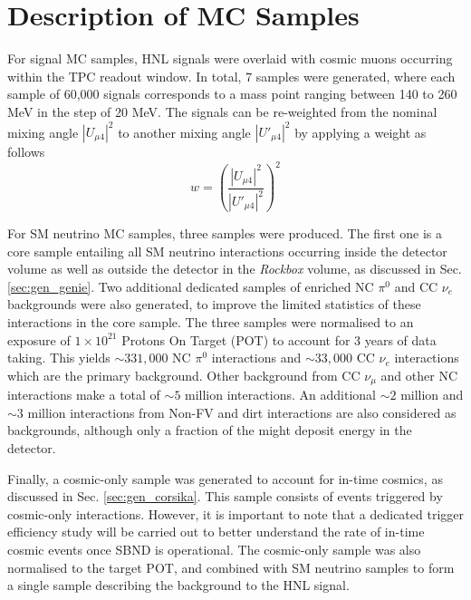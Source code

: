 
\section{Description of MC Samples}
\label{sec:select_mc}


For signal MC samples, HNL signals were overlaid with cosmic muons occurring within the TPC readout window.
In total, 7 samples were generated, where each sample of 60,000 signals corresponds to a mass point ranging between 140 to 260 MeV in the step of 20 MeV.
The signals can be re-weighted from the nominal mixing angle $|U_{\mu4}|^{2}$ to another mixing angle $|U'_{\mu4}|^{2}$ by applying a weight as follows
\begin{equation}
    w = \left(\frac{|U_{\mu4}|^{2}}{|U'_{\mu4}|^{2}}\right)^{2}
\end{equation}

For SM neutrino MC samples, three samples were produced.
The first one is a core sample entailing all SM neutrino interactions occurring inside the detector volume as well as outside the detector in the \textit{Rockbox} volume, as discussed in Sec. \ref{sec:gen_genie}.
Two additional dedicated samples of enriched NC $\pi^0$ and CC $\nu_e$ backgrounds were also generated, to improve the limited statistics of these interactions in the core sample.
The three samples were normalised to an exposure of $1 \times 10^{21}$ Protons On Target (POT) to account for 3 years of data taking.
This yields $\sim331,000$ NC $\pi^0$ interactions and $\sim33,000$ CC $\nu_e$ interactions which are the primary background.
Other background from CC $\nu_\mu$ and other NC interactions make a total of $\sim5$ million interactions.
An additional $\sim2$ million and $\sim3$ million interactions from Non-FV and dirt interactions are also considered as backgrounds, although only a fraction of the might deposit energy in the detector.

Finally, a cosmic-only sample was generated to account for in-time cosmics, as discussed in Sec. \ref{sec:gen_corsika}.
This sample consists of events triggered by cosmic-only interactions.
However, it is important to note that a dedicated trigger efficiency study will be carried out to better understand the rate of in-time cosmic events once SBND is operational.
The cosmic-only sample was also normalised to the target POT, and combined with SM neutrino samples to form a single sample describing the background to the HNL signal.  

